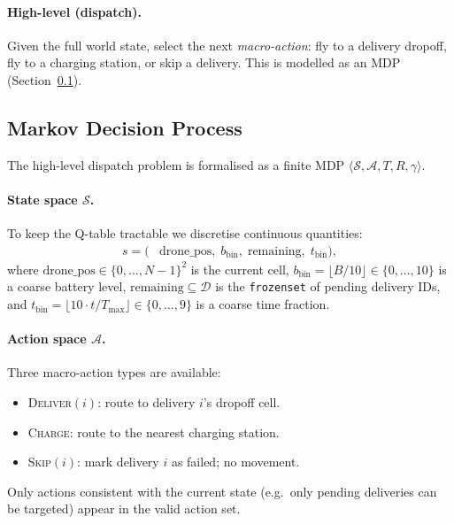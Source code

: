 \documentclass[11pt,twocolumn]{article}
\begin{document}
\paragraph{High-level (dispatch).}
Given the full world state, select the next \emph{macro-action}: fly to
a delivery dropoff, fly to a charging station, or skip a delivery.
This is modelled as an MDP (Section~\ref{sec:mdp}).

\subsection{Markov Decision Process}
\label{sec:mdp}

The high-level dispatch problem is formalised as a finite MDP
$\langle \mathcal{S}, \mathcal{A}, T, R, \gamma \rangle$.

\paragraph{State space $\mathcal{S}$.}
To keep the Q-table tractable we discretise continuous quantities:
\begin{align}
s = \bigl(&\text{drone\_pos},\;
           b_{\text{bin}},\;
           \text{remaining},\;
           t_{\text{bin}}\bigr),
\end{align}
where $\text{drone\_pos} \in \{0,\ldots,N-1\}^2$ is the current cell,
$b_{\text{bin}} = \lfloor B / 10 \rfloor \in \{0,\ldots,10\}$ is a
coarse battery level, $\text{remaining} \subseteq \mathcal{D}$ is the
\texttt{frozenset} of pending delivery IDs, and $t_{\text{bin}} = \lfloor
10 \cdot t / T_{\max} \rfloor \in \{0,\ldots,9\}$ is a coarse time
fraction.

\paragraph{Action space $\mathcal{A}$.}
Three macro-action types are available:
\begin{itemize}[leftmargin=*, nosep]
    \item \textsc{Deliver}$(i)$: route to delivery $i$'s dropoff cell.
    \item \textsc{Charge}: route to the nearest charging station.
    \item \textsc{Skip}$(i)$: mark delivery $i$ as failed; no movement.
\end{itemize}
Only actions consistent with the current state (e.g.\ only pending
deliveries can be targeted) appear in the valid action set.
\end{document}
